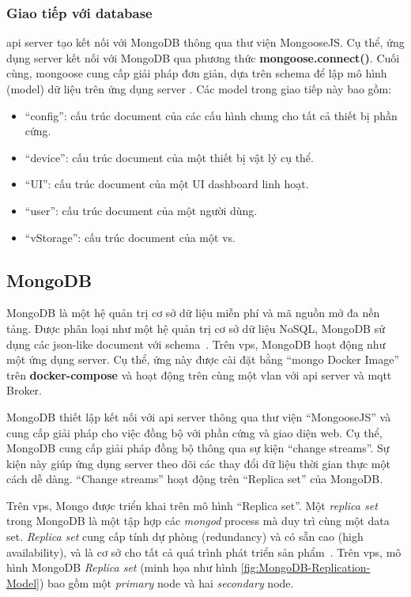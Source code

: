 \subsubsection{Giao tiếp với database}

\acrshort{api} server tạo kết nối với MongoDB thông qua thư viện MongooseJS. Cụ thể, ứng dụng server kết nối với MongoDB qua phương thức \textbf{mongoose.connect()}. Cuối cùng, mongoose cung cấp giải pháp đơn giản, dựa trên schema để lập mô hình (model) dữ liệu trên ứng dụng server \cite{Mongoose-Solution}. Các model trong giao tiếp này bao gồm:

\begin{itemize}
    \item ``config'': cấu trúc document của các cấu hình chung cho tất cả thiết bị phần cứng.
    \item ``device'': cấu trúc document của một thiết bị vật lý cụ thể.
    \item ``UI'': cấu trúc document của một UI dashboard linh hoạt.
    \item ``user'': cấu trúc document của một người dùng.
    \item ``vStorage'': cấu trúc document của một \acrshort{vs}.
\end{itemize}

\subsection{MongoDB}

MongoDB là một hệ quản trị cơ sở dữ liệu miễn phí và mã nguồn mở đa nền tảng. Được phân loại như một hệ quản trị cơ sở dữ liệu NoSQL, MongoDB sử dụng các \acrshort{json}-like document với schema~\cite{MongoDB-Def}. Trên \acrshort{vps}, MongoDB hoạt động như một ứng dụng server. Cụ thể, ứng này được cài đặt bằng ``mongo Docker Image'' trên \textbf{docker-compose} và hoạt động trên cùng một \acrshort{vlan} với \acrshort{api} server và \acrshort{mqtt} Broker.

MongoDB thiết lập kết nối với \acrshort{api} server thông qua thư viện ``MongooseJS'' và cung cấp giải pháp cho việc đồng bộ với phần cứng và giao diện web. Cụ thể, MongoDB cung cấp giải pháp đồng bộ thông qua sự kiện ``change streams''. Sự kiện này giúp ứng dụng server theo dõi các thay đổi dữ liệu thời gian thực một cách dễ dàng. ``Change streams'' hoạt động trên ``Replica set'' của MongoDB.

Trên \acrshort{vps}, Mongo được triển khai trên mô hình ``Replica set''. Một \textit{replica set} trong MongoDB là một tập hợp các \textit{mongod} process mà duy trì cùng một data set. \textit{Replica set} cung cấp tính dự phòng (redundancy) và có sẵn cao (high availability), và là cơ sở cho tất cả quá trình phát triển sản phẩm~\cite{Mongo-Replication-Def}. Trên \acrshort{vps}, mô hình MongoDB \textit{Replica set} (minh họa như hình \ref{fig:MongoDB-Replication-Model}) bao gồm một \textit{primary} node và hai \textit{secondary} node.

